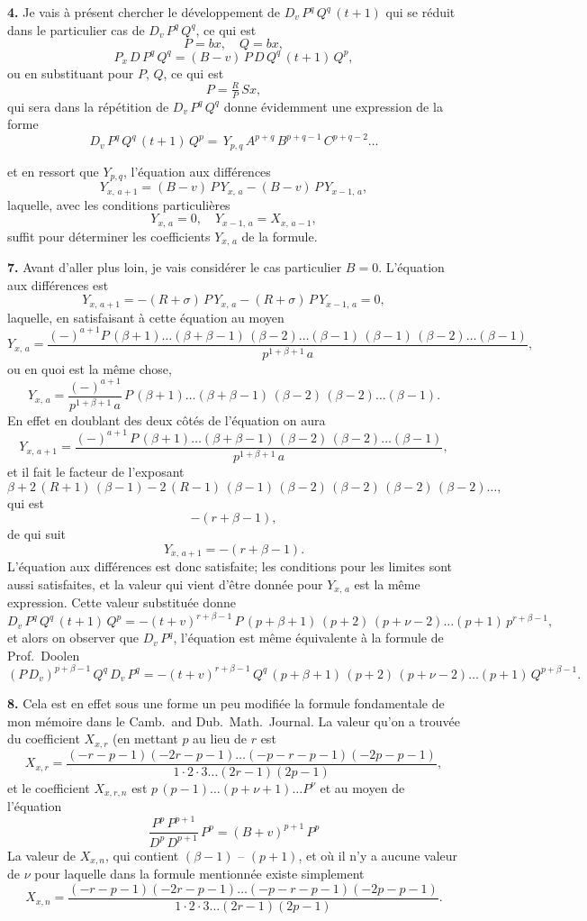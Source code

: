 \documentclass[11pt,a4paper]{article}
\begin{document}
\textbf{4.} Je vais à présent chercher le développement de $D_v\,P^q\,Q^q\,(t+1)$ qui se réduit dans le particulier cas de $D_v\,P^q\,Q^q$, ce qui est
\[
P = bx,\quad Q = bx,
\]
\[
P_x\,D\,P^q\,Q^q = (B-v)\,P\,D\,Q^q\,(t+1)\,Q^p,
\]
ou en substituant pour $P$, $Q$, ce qui est
\[
P = \tfrac{R}{P}\,Sx,
\]
qui sera dans la répétition de $D_v\,P^q\,Q^q$ donne évidemment une expression de la forme
\[
D_v\,P^q\,Q^q\,(t+1)\,Q^p = \,Y_{p,q}\,A^{p+q}\,B^{p+q-1}\,C^{p+q-2}\ldots
\]

\setcounter{page}{140}

et en ressort que $Y_{p,q}$, l'équation aux différences
\[
Y_{x,\,a+1} = (B-v)\,P\,Y_{x,\,a} - (B-v)\,P\,Y_{x-1,\,a},
\]
laquelle, avec les conditions particulières
\[
Y_{x,\,a} = 0,\quad Y_{x-1,\,a} = X_{x,\,a-1},
\]
suffit pour déterminer les coefficients $Y_{x,\,a}$ de la formule.

\textbf{7.} Avant d'aller plus loin, je vais considérer le cas particulier $B=0$. L'équation aux différences est
\[
Y_{x,\,a+1} = -(R+\sigma)\,P\,Y_{x,\,a} - (R+\sigma)\,P\,Y_{x-1,\,a} = 0,
\]
laquelle, en satisfaisant à cette équation au moyen
\[
Y_{x,\,a} = \frac{(-)^{a+1}P\,(\beta+1)\ldots(\beta+\beta-1)\,(\beta-2)\ldots(\beta-1)\,(\beta-1)\,(\beta-2)\ldots(\beta-1)}{p^{1+\beta+1}\,a},
\]
ou en quoi est la même chose,
\[
Y_{x,\,a} = \frac{(-)^{a+1}}{p^{1+\beta+1}\,a}\,P\,(\beta+1)\ldots(\beta+\beta-1)\,(\beta-2)\,(\beta-2)\ldots(\beta-1).
\]
En effet en doublant des deux côtés de l'équation on aura
\[
Y_{x,\,a+1} = \frac{(-)^{a+1}\,P\,(\beta+1)\ldots(\beta+\beta-1)\,(\beta-2)\,(\beta-2)\ldots(\beta-1)}{p^{1+\beta+1}\,a},
\]
et il fait le facteur de l'exposant
\[
\beta + 2\,(R+1)\,(\beta-1) - 2\,(R-1)\,(\beta-1)\,(\beta-2)\,(\beta-2)\,(\beta-2)\,(\beta-2)\ldots,
\]
qui est
\[
- (r+\beta-1),
\]
de qui suit
\[
Y_{x,\,a+1} = -(r+\beta-1).
\]
L'équation aux différences est donc satisfaite; les conditions pour les limites sont aussi satisfaites, et la valeur qui vient d'être donnée pour $Y_{x,\,a}$ est la même expression. Cette valeur substituée donne
\[
D_v\,P^q\,Q^q\,(t+1)\,Q^p = -(t+v)^{r+\beta-1}\,P\,(p+\beta+1)\,(p+2)\,(p+\nu-2)\ldots(p+1)\,p^{r+\beta-1},
\]
et alors on observer que $D_v\,P^q$, l'équation est même équivalente à la formule de Prof.~Doolen
\[
(P\,D_v)^{p+\beta-1}\,Q^q\,D_v\,P^q = -(t+v)^{r+\beta-1}\,Q^q\,(p+\beta+1)\,(p+2)\,(p+\nu-2)\ldots(p+1)\,Q^{p+\beta-1}.
\]

\setcounter{page}{141}

\textbf{8.} Cela est en effet sous une forme un peu modifiée la formule fondamentale de mon mémoire dans le Camb.\ and Dub.\ Math.\ Journal. La valeur qu'on a trouvée du coefficient $X_{x,r}$ (en mettant $p$ au lieu de $r$ est
\[
X_{x,r} = \frac{(-r-p-1)(-2r-p-1)\ldots(-p-r-p-1)(-2p-p-1)}{1\cdot 2\cdot 3 \ldots (2r-1)(2p-1)},
\]
et le coefficient $X_{x,r,n}$ est $p\,(p-1)\ldots(p+\nu+1)\ldots P^\nu$ et au moyen de l'équation
\[
\frac{P^p\,P^{p+1}}{D^p\,D^{p+1}}\,P^p = (B+v)^{p+1}\,P^p
\]
La valeur de $X_{x,n}$, qui contient $(\beta-1)$ -- $(p+1)$, et où il n'y a aucune valeur de $\nu$ pour laquelle dans la formule mentionnée existe simplement
\[
X_{x,n} = \frac{(-r-p-1)(-2r-p-1)\ldots(-p-r-p-1)(-2p-p-1)}{1\cdot 2\cdot 3 \ldots (2r-1)(2p-1)}.
\]
\end{document}
